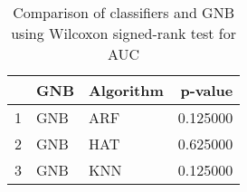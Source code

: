\begin{table}
\footnotesize
\caption{Comparison of classifiers and GNB using Wilcoxon signed-rank test for AUC}
\label{tab:GNB wilcoxon AUC comparison}
\begin{tabular}{lllr}
\hline
 & GNB & Algorithm & p-value \\
\hline
1 & GNB & ARF & 0.125000 \\
2 & GNB & HAT & 0.625000 \\
3 & GNB & KNN & 0.125000 \\
\hline
\end{tabular}
\end{table}
